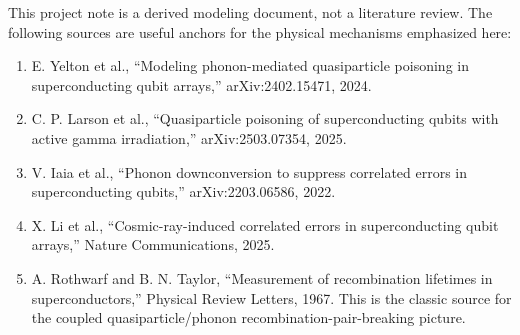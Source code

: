 \documentclass[11pt]{article}
\begin{document}
This project note is a derived modeling document, not a literature review. The following sources are useful anchors for the physical mechanisms emphasized here:
\begin{enumerate}[leftmargin=2em]
\item E. Yelton et al., ``Modeling phonon-mediated quasiparticle poisoning in superconducting qubit arrays,'' arXiv:2402.15471, 2024.
\item C. P. Larson et al., ``Quasiparticle poisoning of superconducting qubits with active gamma irradiation,'' arXiv:2503.07354, 2025.
\item V. Iaia et al., ``Phonon downconversion to suppress correlated errors in superconducting qubits,'' arXiv:2203.06586, 2022.
\item X. Li et al., ``Cosmic-ray-induced correlated errors in superconducting qubit arrays,'' Nature Communications, 2025.
\item A. Rothwarf and B. N. Taylor, ``Measurement of recombination lifetimes in superconductors,'' Physical Review Letters, 1967. This is the classic source for the coupled quasiparticle/phonon recombination-pair-breaking picture.
\end{enumerate}
\end{document}
